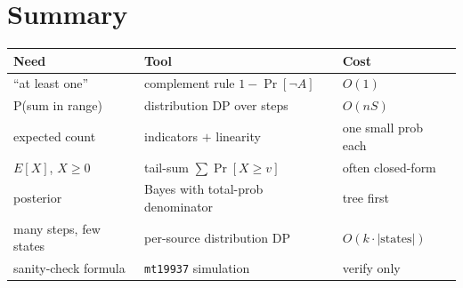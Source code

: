 \section*{Summary}
\begin{tabularx}{\linewidth}{@{}lXl@{}}
\textbf{Need} & \textbf{Tool} & \textbf{Cost}\\
\midrule
``at least one'' & complement rule $1-\Pr[\neg A]$ & $O(1)$\\
P(sum in range) & distribution DP over steps & $O(nS)$\\
expected count & indicators $+$ linearity & one small prob each\\
$E[X]$, $X\ge0$ & tail-sum $\sum\Pr[X\ge v]$ & often closed-form\\
posterior & Bayes with total-prob denominator & tree first\\
many steps, few states & per-source distribution DP & $O(k\cdot|\text{states}|)$\\
sanity-check formula & \texttt{mt19937} simulation & verify only\\
\end{tabularx}

